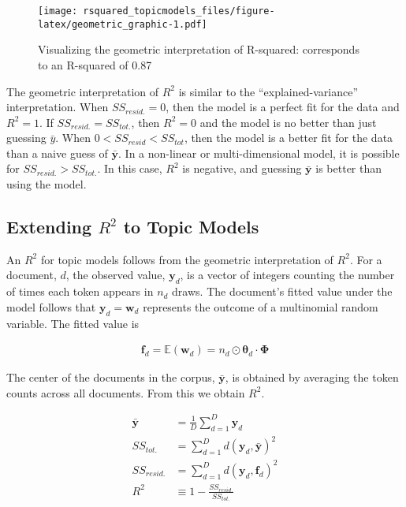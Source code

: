 \documentclass[conference,final,]{IEEEtran}
\makeatletter
\def\maxwidth{\ifdim\Gin@nat@width>\linewidth\linewidth
\else\Gin@nat@width\fi}
\let\Oldincludegraphics\includegraphics
\renewcommand{\includegraphics}[1]{\Oldincludegraphics[width=\maxwidth]{#1}}
\makeatother
\begin{document}
\begin{figure}
\centering
\texttt{[image: rsquared\_topicmodels\_files/figure-latex/geometric\_graphic-1.pdf]}
\caption{Visualizing the geometric interpretation of R-squared:
corresponds to an R-squared of 0.87}
\end{figure}

The geometric interpretation of \(R^2\) is similar to the
``explained-variance'' interpretation. When \(SS_{resid.} = 0\), then
the model is a perfect fit for the data and \(R^2 = 1\). If
\(SS_{resid.} = SS_{tot.}\), then \(R^2 = 0\) and the model is no better
than just guessing \(\bar{y}\). When \(0 < SS_{resid} < SS_{tot}\), then
the model is a better fit for the data than a naive guess of
\(\bar{\mathbf{y}}\). In a non-linear or multi-dimensional model, it is
possible for \(SS_{resid.} > SS_{tot.}\). In this case, \(R^2\) is
negative, and guessing \(\bar{\mathbf{y}}\) is better than using the
model.

\hypertarget{extending-r2-to-topic-models}{%
\subsection{\texorpdfstring{Extending \(R^2\) to Topic
Models}{Extending R\^{}2 to Topic Models}}\label{extending-r2-to-topic-models}}

An \(R^2\) for topic models follows from the geometric interpretation of
\(R^2\). For a document, \(d\), the observed value, \(\mathbf{y}_d\), is
a vector of integers counting the number of times each token appears in
\(n_d\) draws. The document's fitted value under the model follows that
\(\mathbf{y}_d = \mathbf{w}_d\) represents the outcome of a multinomial
random variable. The fitted value is

\begin{align}
  \mathbf{f}_d = 
    \mathbb{E}(\mathbf{w}_d) = 
    n_d \odot \boldsymbol\theta_d \cdot \boldsymbol\Phi 
\end{align}

The center of the documents in the corpus, \(\bar{\mathbf{y}}\), is
obtained by averaging the token counts across all documents. From this
we obtain \(R^2\).

\begin{align}
    \bar{\mathbf{y}} &= \frac{1}{D}\sum_{d=1}^{D}\mathbf{y}_d\\
    SS_{tot.} &= \sum_{d=1}^D{d(\mathbf{y}_d, \bar{\mathbf{y}})^2}\\
    SS_{resid.} &= \sum_{d=1}^D{d(\mathbf{y}_d, \mathbf{f}_d)^2}\\
    R^2 &\equiv 1 - \frac{SS_{resid.}}{SS_{tot.} }
\end{align}
\end{document}
